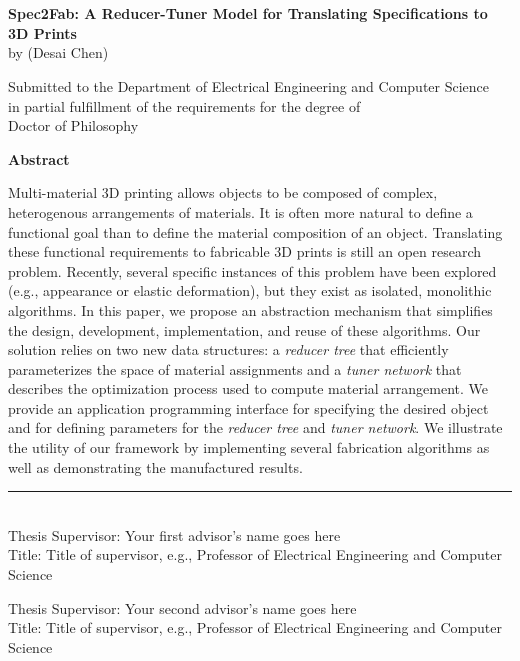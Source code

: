 \chapter*{}
\label{chap:abstract}
\begin{center}
\vspace{-8em}
{\large \textsf{\textbf{Spec2Fab: A Reducer-Tuner Model for Translating Specifications to 3D Prints}}} \\
by (Desai Chen)

\vspace{.2in}

Submitted to the Department of Electrical Engineering and Computer Science \\
in partial fulfillment of the requirements for the degree of \\
Doctor of Philosophy \\ %
\end{center}

\noindent\textsf{\textbf{Abstract}}

\noindent Multi-material 3D printing allows objects to be composed of complex, heterogenous arrangements of materials. It is often more natural to define a functional goal than to define the material composition of an object. Translating these functional requirements to fabricable 3D prints is still an open research problem. Recently, several specific instances of this problem have been explored (e.g.,  appearance or elastic deformation), but they exist as isolated, monolithic algorithms. In this paper, we propose an abstraction mechanism that simplifies the design, development, implementation, and reuse of these algorithms. Our solution relies on two new data structures: a \emph{reducer tree} that efficiently parameterizes the space of material assignments and a \emph{tuner network} that describes the optimization process used to compute material arrangement. We provide an application programming interface for specifying the desired object and for defining parameters for the \emph{reducer tree} and \emph{tuner network}. We illustrate the utility of our framework by implementing several fabrication algorithms as well as demonstrating the manufactured results.

\noindent\rule[0.5ex]{2in}{1pt} \\
Thesis Supervisor: Your first advisor's name goes here \\
Title: Title of supervisor, e.g., Professor of Electrical Engineering and Computer Science

\vspace{.1in}

\noindent Thesis Supervisor: Your second advisor's name goes here \\
Title: Title of supervisor, e.g., Professor of Electrical Engineering and Computer Science

